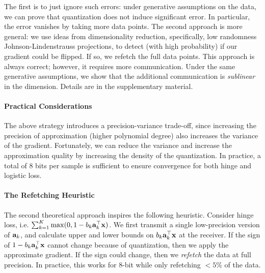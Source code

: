 \documentclass{article}
\def\a{{\bf a}}
\def\x{{\bf x}}
\begin{document}
The first is to just ignore such errors: under generative assumptions on the data, we can prove that quantization does not induce significant error. 
In particular, the error vanishes by taking more data points.
The second approach is more general: we use ideas from dimensionality reduction, specifically, low randomness Johnson-Lindenstrauss projections, to detect (with high probability) if our gradient could be flipped. If so, we refetch the full data points. 
This approach is always correct; however, it requires more communication.
Under the same generative assumptions, we show that the additional communication is \emph{sublinear} in the dimension.
Details are in the supplementary material.

\vspace{-1em}
\paragraph{Practical Considerations} The above strategy introduces a precision-variance trade-off, since increasing the precision of approximation (higher polynomial degree) also increases the variance of the gradient. 
Fortunately, we can reduce the variance and increase the approximation quality by increasing the density of the quantization. 
In practice, a total of $8$ bits per sample is sufficient to ensure convergence for both hinge and logistic loss. 

\vspace{-1em}
\paragraph*{The Refetching Heuristic}
The second theoretical approach inspires the following heuristic. 
Consider hinge loss, i.e.  $\sum_{k=1}^K \max(0, 1 - b_k \a_k^\top \x)$. 
We first transmit a single low-precision version of $\a_k$, and   
calculate upper and lower bounds on $b_k \a_k^\top \x$ at the receiver.
If the sign of $1-b_k \a_k^\top \x$ cannot change because of quantization, then we apply the approximate gradient. 
If the sign could change, then we {\em refetch} the data at full precision.
In practice, this works for 
8-bit while only refetching $<5\%$ of the data.
\end{document}
